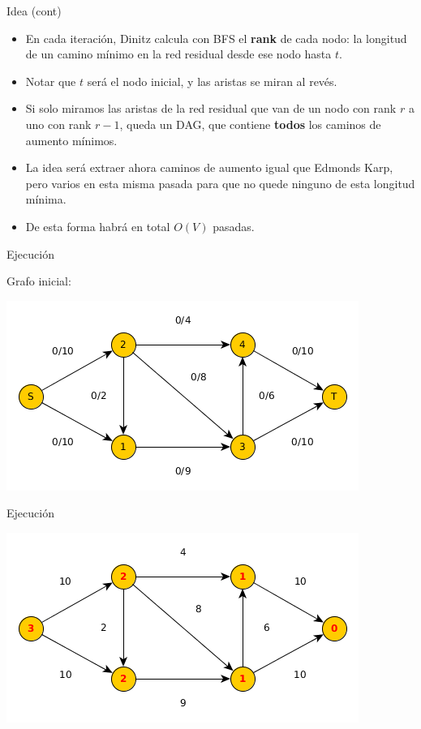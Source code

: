 \documentclass{beamer}
\begin{document}
\begin{frame}{Idea (cont)}
    \begin{itemize}
        \item En cada iteración, Dinitz calcula con BFS el \textbf{rank} de cada nodo: la longitud de un camino mínimo en la red residual desde ese nodo hasta $t$.
        \item Notar que $t$ será el nodo inicial, y las aristas se miran al revés.
        \item Si solo miramos las aristas de la red residual que van de un nodo con rank $r$ a uno con rank $r-1$, queda un DAG, que contiene \textbf{todos} los caminos de aumento mínimos.
        \item La idea será extraer ahora caminos de aumento igual que Edmonds Karp, pero varios en esta misma pasada para que no quede ninguno de esta longitud mínima.
        \item De esta forma habrá en total $O(V)$ pasadas.
    \end{itemize}
\end{frame}

\begin{frame}{Ejecución}

    Grafo inicial:
    
    \includegraphics[scale=0.6]{dinitz/dinitz1.png}
    
\end{frame}

\begin{frame}{Ejecución}

    
    \includegraphics[scale=0.6]{dinitz/dinitz2.png}
    
\end{frame}
\end{document}
